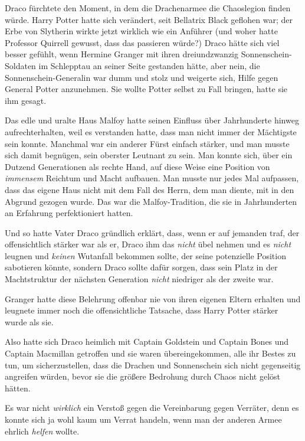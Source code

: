 {Draco fürchtete den Moment, in dem die Drachenarmee die Chaoslegion finden würde. Harry Potter hatte sich verändert, seit Bellatrix Black geflohen war; der Erbe von Slytherin wirkte jetzt wirklich wie ein Anführer (und woher hatte Professor Quirrell gewusst, dass das passieren würde?) Draco hätte sich viel besser gefühlt, wenn Hermine Granger mit ihren dreiundzwanzig Sonnenschein-Soldaten im Schlepptau an seiner Seite gestanden hätte, aber nein, die Sonnenschein-Generalin war dumm und stolz und weigerte sich, Hilfe gegen General Potter anzunehmen. Sie wollte Potter selbst zu Fall bringen, hatte sie ihm gesagt.

Das edle und uralte Haus Malfoy hatte seinen Einfluss über Jahrhunderte hinweg aufrechterhalten, weil es verstanden hatte, dass man nicht immer der Mächtigste sein konnte. Manchmal war ein anderer Fürst einfach stärker, und man musste sich damit begnügen, sein oberster Leutnant zu sein. Man konnte sich, über ein Dutzend Generationen als rechte Hand, auf diese Weise eine Position von \emph{immensem} Reichtum und Macht aufbauen. Man musste nur jedes Mal aufpassen, dass das eigene Haus nicht mit dem Fall des Herrn, dem man diente, mit in den Abgrund gezogen wurde. Das war die Malfoy-Tradition, die sie in Jahrhunderten an Erfahrung perfektioniert hatten.

Und so hatte Vater Draco gründlich erklärt, dass, wenn er auf jemanden traf, der offensichtlich stärker war als er, Draco ihm das \emph{nicht} übel nehmen und es \emph{nicht} leugnen und \emph{keinen} Wutanfall bekommen sollte, der seine potenzielle Position sabotieren könnte, sondern Draco sollte dafür sorgen, dass sein Platz in der Machtstruktur der nächsten Generation \emph{nicht} niedriger als der zweite war.

Granger hatte diese Belehrung offenbar nie von ihren eigenen Eltern erhalten und leugnete immer noch die offensichtliche Tatsache, dass Harry Potter stärker wurde als sie.

Also hatte sich Draco heimlich mit Captain Goldstein und Captain Bones und Captain Macmillan getroffen und sie waren übereingekommen, alle ihr Bestes zu tun, um sicherzustellen, dass die Drachen und Sonnenschein sich nicht gegenseitig angreifen würden, bevor sie die größere Bedrohung durch Chaos nicht gelöst hätten.

Es war nicht \emph{wirklich} ein Verstoß gegen die Vereinbarung gegen Verräter, denn es konnte sich ja wohl kaum um Verrat handeln, wenn man der anderen Armee ehrlich \emph{helfen} wollte.

}
